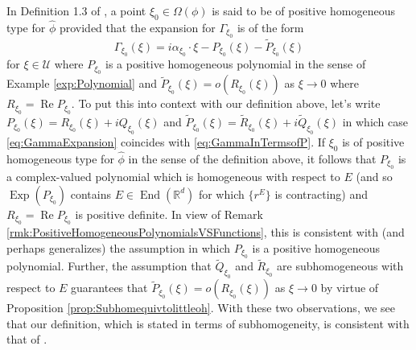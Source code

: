 \documentclass[11pt, letter]{book}
\renewcommand\Re{\operatorname{Re}}%
\newcommand\End{\operatorname{End}} %
\newcommand\Exp{\operatorname{Exp}}
\begin{document}
\noindent In Definition 1.3 of \cite{randles_convolution_2017}, a point $\xi_0\in\Omega(\phi)$ is said to be of positive homogeneous type for $\widehat{\phi}$ provided that the expansion for $\Gamma_{\xi_0}$ is of the form
\begin{equation}\label{eq:GammaInTermsofP}
    \Gamma_{\xi_0}(\xi)=i\alpha_{\xi_0}\cdot\xi-P_{\xi_0}(\xi)-\widetilde{P}_{\xi_0}(\xi)
\end{equation}
for $\xi\in\mathcal{U}$ where $P_{\xi_0}$ is a positive homogeneous polynomial in the sense of Example \ref{exp:Polynomial} and $\widetilde{P}_{\xi_0}(\xi)=o(R_{\xi_0}(\xi))$ as $\xi\to 0$ where $R_{\xi_0}=\Re P_{\xi_0}$. To put this into context with our definition above, let's write $P_{\xi_0}(\xi)=R_{\xi_0}(\xi)+iQ_{\xi_0}(\xi)$ and $\widetilde{P}_{\xi_0}(\xi)=\widetilde{R}_{\xi_0}(\xi)+i\widetilde{Q}_{\xi_0}(\xi)$ in which case \eqref{eq:GammaExpansion} coincides with \eqref{eq:GammaInTermsofP}. If $\xi_0$ is of positive homogeneous type for $\widehat{\phi}$ in the sense of the definition above, it follows that $P_{\xi_0}$ is a complex-valued polynomial which is homogeneous with respect to $E$ (and so $\Exp(P_{\xi_0})$ contains $E\in\End(\mathbb{R}^d)$ for which $\{r^E\}$ is contracting) and $R_{\xi_0}=\Re P_{\xi_0}$ is positive definite. In view of Remark \ref{rmk:PositiveHomogeneousPolynomialsVSFunctions}, this is consistent with (and perhaps generalizes) the assumption in which $P_{\xi_0}$ is a positive homogeneous polynomial. Further, the assumption that $\widetilde{Q}_{\xi_0}$ and $\widetilde{R}_{\xi_0}$ are subhomogeneous with respect to $E$ guarantees that $\widetilde{P}_{\xi_0}(\xi)=o(R_{\xi_0}(\xi))$ as $\xi\to 0$ by virtue of Proposition \ref{prop:Subhomequivtolittleoh}. With these two observations, we see that our definition, which is stated in terms of subhomogeneity, is consistent with that of \cite{randles_convolution_2017}. \\
\end{document}
